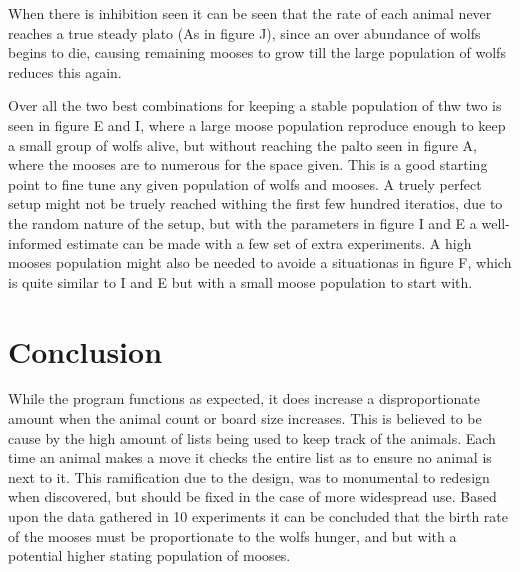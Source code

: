 \documentclass{article}
\begin{document}
        When there is inhibition seen it can be seen that the rate of each animal never	 reaches a true steady plato (As in figure J), since an over abundance of wolfs begins to die, causing remaining mooses to grow till the large population of wolfs reduces this again. \newline
        
       
        
        Over all the two best combinations for keeping a stable population of thw two is seen in figure E and I, where a large moose population reproduce enough to keep a small group of wolfs alive, but without reaching the palto seen in figure A, where the mooses are to numerous for the space given.  This is a good starting point to fine tune any given population of wolfs and mooses. A truely perfect setup might not be truely reached withing the first few hundred iteratios, due to the random nature of the setup, but with the parameters in figure I and E a well-informed estimate can be made with a few set of extra experiments. A high mooses population might also be needed to avoide a situationas in figure F, which is quite similar to I and E but with a small moose population to start with.
        
    \section{Conclusion}
     While the program functions as expected, it does increase a disproportionate amount when the animal count or board size increases. This is believed to be cause by the high amount of lists being used to keep track of the animals. Each time an animal makes a move it checks the entire list as to ensure no animal is next to it. This ramification due to the design, was to monumental to redesign when discovered, but should be fixed in the case of more widespread use. \newline
     Based upon the data gathered in 10 experiments it can be concluded that the birth rate of the mooses must be proportionate to the wolfs hunger, and but with a potential higher stating population of mooses. 
     
 
\end{document}
